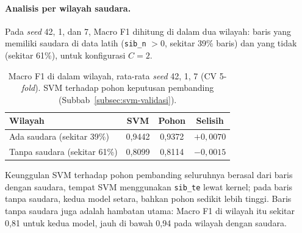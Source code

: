 \paragraph{Analisis per wilayah saudara.} Pada \textit{seed} 42, 1, dan 7, Macro F1 dihitung di dalam dua wilayah: baris yang memiliki saudara di data latih (\texttt{sib\_n} $> 0$, sekitar 39\% baris) dan yang tidak (sekitar 61\%), untuk konfigurasi $C = 2$.
\begin{table}[H]
	\centering
	\caption{Macro F1 di dalam wilayah, rata-rata \textit{seed} 42, 1, 7 (CV 5-\textit{fold}). SVM terhadap pohon keputusan pembanding (Subbab~\ref{subsec:svm-validasi}).}
	\label{tab:svm-wilayah}
	\small
	\begin{tabular}{l c c c}
		\toprule
		\textbf{Wilayah} & \textbf{SVM} & \textbf{Pohon} & \textbf{Selisih} \\
		\midrule
		Ada saudara (sekitar 39\%) & 0,9442 & 0,9372 & $+0{,}0070$ \\
		Tanpa saudara (sekitar 61\%) & 0,8099 & 0,8114 & $-0{,}0015$ \\
		\bottomrule
	\end{tabular}
\end{table}
Keunggulan SVM terhadap pohon pembanding seluruhnya berasal dari baris dengan saudara, tempat SVM menggunakan \texttt{sib\_te} lewat kernel; pada baris tanpa saudara, kedua model setara, bahkan pohon sedikit lebih tinggi. Baris tanpa saudara juga adalah hambatan utama: Macro F1 di wilayah itu sekitar 0,81 untuk kedua model, jauh di bawah 0,94 pada wilayah dengan saudara.

